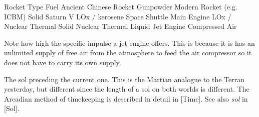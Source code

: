 {
    \bTABLE[split=repeat,option=stretch]%
    \setupTABLE[row][each][align=center]

    \bTABLEhead
    \bTR
      \bTH Rocket Type \eTH
      \bTH Fuel \eTH
      \bTH {} \eTH
    \eTR
    \eTABLEhead
    \bTABLEbody
    \bTR
      \bTC Ancient Chinese Rocket \eTC
      \bTC Gunpowder \eTC
       \eTC
    \eTR
    \bTR
      \bTC Modern Rocket (e.g. ICBM) \eTC
      \bTC Solid \eTC
       \eTC
    \eTR
    \bTR
      \bTC Saturn V \eTC
      \bTC LOx / kerosene \eTC
       \eTC
    \eTR
    \bTR
      \bTC Space Shuttle Main Engine \eTC
      \bTC LOx /  \eTC
       \eTC
    \eTR
    \bTR
      \bTC Nuclear Thermal \eTC
      \bTC Solid \eTC
       \eTC
    \eTR
    \bTR
      \bTC Nuclear Thermal \eTC
      \bTC Liquid \eTC
       \eTC
    \eTR
    \bTR
      \bTC Jet Engine \eTC
      \bTC Compressed Air \eTC
       \eTC
    \eTR
\eTABLEbody
\eTABLE
}

Note how high the specific impulse a jet engine offers. This is because it is has an unlimited supply of free air from the atmosphere to feed the air compressor so it does not have to carry its own supply.

The sol preceding the current one. This is the Martian analogue to the Terran yesterday, but different since the length of a sol on both worlds is different. The Arcadian method of timekeeping is described in detail in [Time]. See also {\it sol} in [Sol].

\StopChapter

